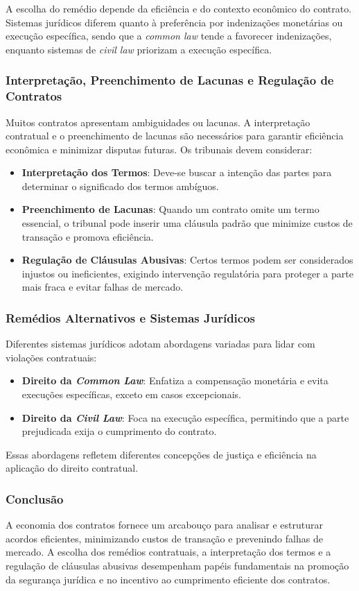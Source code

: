 \documentclass[a4paper,12pt]{article}[abntex2]
\begin{document}
A escolha do remédio depende da eficiência e do contexto econômico do contrato. Sistemas jurídicos diferem quanto à preferência por indenizações monetárias ou execução específica, sendo que a \textit{common law} tende a favorecer indenizações, enquanto sistemas de \textit{civil law} priorizam a execução específica.

\subsubsection{Interpretação, Preenchimento de Lacunas e Regulação de Contratos}

Muitos contratos apresentam ambiguidades ou lacunas. A interpretação contratual e o preenchimento de lacunas são necessários para garantir eficiência econômica e minimizar disputas futuras. Os tribunais devem considerar:
\begin{itemize}
    \item \textbf{Interpretação dos Termos}: Deve-se buscar a intenção das partes para determinar o significado dos termos ambíguos.
    \item \textbf{Preenchimento de Lacunas}: Quando um contrato omite um termo essencial, o tribunal pode inserir uma cláusula padrão que minimize custos de transação e promova eficiência.
    \item \textbf{Regulação de Cláusulas Abusivas}: Certos termos podem ser considerados injustos ou ineficientes, exigindo intervenção regulatória para proteger a parte mais fraca e evitar falhas de mercado.
\end{itemize}

\subsubsection{Remédios Alternativos e Sistemas Jurídicos}
Diferentes sistemas jurídicos adotam abordagens variadas para lidar com violações contratuais:
\begin{itemize}
    \item \textbf{Direito da \textit{Common Law}}: Enfatiza a compensação monetária e evita execuções específicas, exceto em casos excepcionais.
    \item \textbf{Direito da \textit{Civil Law}}: Foca na execução específica, permitindo que a parte prejudicada exija o cumprimento do contrato.
\end{itemize}
Essas abordagens refletem diferentes concepções de justiça e eficiência na aplicação do direito contratual.

\subsubsection{Conclusão}
A economia dos contratos fornece um arcabouço para analisar e estruturar acordos eficientes, minimizando custos de transação e prevenindo falhas de mercado. A escolha dos remédios contratuais, a interpretação dos termos e a regulação de cláusulas abusivas desempenham papéis fundamentais na promoção da segurança jurídica e no incentivo ao cumprimento eficiente dos contratos.
\end{document}
